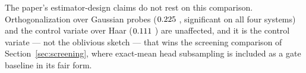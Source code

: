 \documentclass{article}
\begin{document}
The paper's estimator-design claims do not rest on this comparison. Orthogonalization over Gaussian
probes ($0.225$ \fsDeltaOrthoCI{}, significant on all four systems) and the control variate
over Haar ($0.111$ \fsDeltaCVCI{}) are unaffected, and it is the control variate --- not the
oblivious sketch --- that wins the screening comparison of Section~\ref{sec:screening}, where
exact-mean head subsampling is included as a gate baseline in its fair form.
\end{document}
